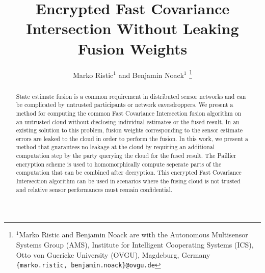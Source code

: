 \documentclass[letterpaper, 10 pt, conference]{ieeeconf}
\title{\LARGE \bf
Encrypted Fast Covariance Intersection Without Leaking Fusion Weights
}
\author{Marko Ristic$^{1}$ and Benjamin Noack$^{1}$%
\thanks{$^{1}$Marko Ristic and Benjamin Noack are with the Autonomous Multisensor Systems Group (AMS), Institute for Intelligent Cooperating Systems (ICS), Otto von Guericke University (OVGU), Magdeburg, Germany {\tt\small \{marko.ristic, benjamin.noack\}@ovgu.de}}%
}
\begin{document}
\maketitle
\thispagestyle{empty}
\pagestyle{empty}

% 
%                                    
%                                    
%                                    
% 
\begin{abstract}
    State estimate fusion is a common requirement in distributed sensor networks and can be complicated by untrusted participants or network eavesdroppers. We present a method for computing the common Fast Covariance Intersection fusion algorithm on an untrusted cloud without disclosing individual estimates or the fused result. In an existing solution to this problem, fusion weights corresponding to the sensor estimate errors are leaked to the cloud in order to perform the fusion. In this work, we present a method that guarantees no leakage at the cloud by requiring an additional computation step by the party querying the cloud for the fused result. The Paillier encryption scheme is used to homomorphically compute seperate parts of the computation that can be combined after decryption. This encrypted Fast Covariance Intersection algorithm can be used in scenarios where the fusing cloud is not trusted and relative sensor performances must remain confidential.
\end{abstract}


% 
%                                                        
%                                                        
%                                                        
% 
\end{document}

